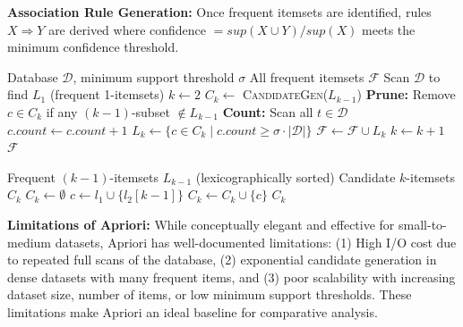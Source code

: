 \documentclass[conference]{IEEEtran}
\begin{document}
\textbf{Association Rule Generation:} Once frequent itemsets are identified, rules $X \Rightarrow Y$ are derived where confidence $= sup(X \cup Y) / sup(X)$ meets the minimum confidence threshold.

\begin{algorithm}[htbp]
\caption{Classical Apriori Algorithm}
\label{alg:apriori}
\begin{algorithmic}[1]
\REQUIRE Database $\mathcal{D}$, minimum support threshold $\sigma$
\ENSURE All frequent itemsets $\mathcal{F}$
\STATE Scan $\mathcal{D}$ to find $L_1$ (frequent 1-itemsets)
\STATE $k \leftarrow 2$
    \STATE $C_k \leftarrow$ \textsc{CandidateGen}($L_{k-1}$)
    \STATE \textbf{Prune:} Remove $c \in C_k$ if any $(k{-}1)$-subset $\notin L_{k-1}$
    \STATE \textbf{Count:} Scan all $t \in \mathcal{D}$
            \STATE $c.count \leftarrow c.count + 1$
        \ENDFOR
    \ENDFOR
    \STATE $L_k \leftarrow \{c \in C_k \mid c.count \geq \sigma \cdot |\mathcal{D}|\}$
    \STATE $\mathcal{F} \leftarrow \mathcal{F} \cup L_k$
    \STATE $k \leftarrow k + 1$
\ENDWHILE
\RETURN $\mathcal{F}$
\end{algorithmic}
\end{algorithm}

\begin{algorithm}[htbp]
\caption{CandidateGen$(L_{k-1})$}
\label{alg:candgen}
\begin{algorithmic}[1]
\REQUIRE Frequent $(k{-}1)$-itemsets $L_{k-1}$ (lexicographically sorted)
\ENSURE Candidate $k$-itemsets $C_k$
\STATE $C_k \leftarrow \emptyset$
        \STATE $c \leftarrow l_1 \cup \{l_2[k{-}1]\}$
        \STATE $C_k \leftarrow C_k \cup \{c\}$
    \ENDIF
\ENDFOR
\RETURN $C_k$
\end{algorithmic}
\end{algorithm}

\textbf{Limitations of Apriori:} While conceptually elegant and effective for small-to-medium datasets, Apriori has well-documented limitations: (1) High I/O cost due to repeated full scans of the database, (2) exponential candidate generation in dense datasets with many frequent items, and (3) poor scalability with increasing dataset size, number of items, or low minimum support thresholds. These limitations make Apriori an ideal baseline for comparative analysis.
\end{document}
